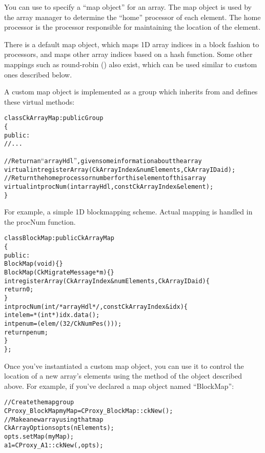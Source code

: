 \label{array map}

You can use  to specify a ``map object''
for an array.  The map object is used by the array manager
to determine the ``home'' processor of each element.  The
home processor is the processor responsible for maintaining
the location of the element.

There is a default map object, which maps 1D array indices
in a block fashion to processors, and maps other array
indices based on a hash function. Some other mappings such as round-robin
() also exist, which can be used
similar to custom ones described below.

A custom map object is implemented as a group which inherits from
 and defines these virtual methods:

\begin{alltt}
class CkArrayMap : public Group
\{
public:
  //...
  
  //Return an ``arrayHdl'', given some information about the array
  virtual int registerArray(CkArrayIndex& numElements,CkArrayID aid);
  //Return the home processor number for this element of this array
  virtual int procNum(int arrayHdl,const CkArrayIndex &element);
\}
\end{alltt}

For example, a simple 1D blockmapping scheme.  Actual mapping is
handled in the procNum function.

\begin{alltt}
class BlockMap : public CkArrayMap 
\{
 public:
  BlockMap(void) \{\}
  BlockMap(CkMigrateMessage *m)\{\}
  int registerArray(CkArrayIndex& numElements,CkArrayID aid) \{
    return 0;
  \}
  int procNum(int /*arrayHdl*/,const CkArrayIndex &idx) \{
    int elem=*(int *)idx.data();
    int penum =  (elem/(32/CkNumPes()));
    return penum;
  \}
\};

\end{alltt}
Once you've instantiated a custom map object, you can use it to
control the location of a new array's elements using the
 method of the  object described above.
For example, if you've declared a map object named ``BlockMap'':

\begin{alltt}
//Create the map group
  CProxy_BlockMap myMap=CProxy_BlockMap::ckNew();
//Make a new array using that map
  CkArrayOptions opts(nElements);
  opts.setMap(myMap);
  a1=CProxy_A1::ckNew(,opts);
\end{alltt}



